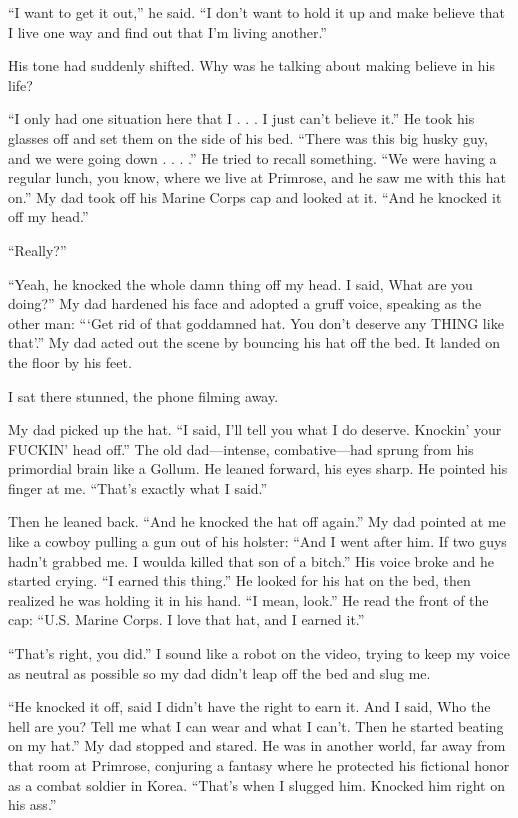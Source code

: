 \documentclass[12pt]{book}
\begin{document}
``I want to get it out,'' he said. ``I don't want to hold it up and make believe that I live one way and find out that I'm living another.''

His tone had suddenly shifted. Why was he talking about making believe in his life?

``I only had one situation here that I . . . I just can't believe it.'' He took his glasses off and set them on the side of his bed. ``There was this big husky guy, and we were going down . . . .'' He tried to recall something. ``We were having a regular lunch, you know, where we live at Primrose, and he saw me with this hat on.'' My dad took off his Marine Corps cap and looked at it. ``And he knocked it off my head.''

``Really?''

``Yeah, he knocked the whole damn thing off my head. I said, What are you doing?'' My dad hardened his face and adopted a gruff voice, speaking as the other man: ```Get rid of that goddamned hat. You don't deserve any THING like that'.'' My dad acted out the scene by bouncing his hat off the bed. It landed on the floor by his feet.

I sat there stunned, the phone filming away.

My dad picked up the hat. ``I said, I'll tell you what I do deserve. Knockin' your FUCKIN' head off.'' The old dad---intense, combative---had sprung from his primordial brain like a Gollum. He leaned forward, his eyes sharp. He pointed his finger at me. ``That's exactly what I said.''

Then he leaned back. ``And he knocked the hat off again.'' My dad pointed at me like a cowboy pulling a gun out of his holster: ``And I went after him. If two guys hadn't grabbed me. I woulda killed that son of a bitch.'' His voice broke and he started crying. ``I earned this thing.'' He looked for his hat on the bed, then realized he was holding it in his hand. ``I mean, look.'' He read the front of the cap: ``U.S. Marine Corps. I love that hat, and I earned it.''

``That's right, you did.'' I sound like a robot on the video, trying to keep my voice as neutral as possible so my dad didn't leap off the bed and slug me.

``He knocked it off, said I didn't have the right to earn it. And I said, Who the hell are you? Tell me what I can wear and what I can't. Then he started beating on my hat.'' My dad stopped and stared. He was in another world, far away from that room at Primrose, conjuring a fantasy where he protected his fictional honor as a combat soldier in Korea. ``That's when I slugged him. Knocked him right on his ass.''
\end{document}

